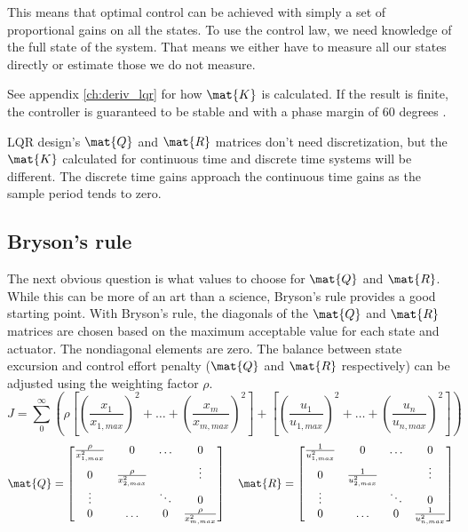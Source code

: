 This means that optimal control can be achieved with simply a set of
proportional gains on all the \glspl{state}. To use the \gls{control law}, we
need knowledge of the full \gls{state} of the \gls{system}. That means we either
have to measure all our \glspl{state} directly or estimate those we do not
measure.

See appendix \ref{ch:deriv_lqr} for how $\mat{K}$ is calculated. If the result
is finite, the controller is guaranteed to be stable and
 with a \gls{phase margin} of 60 degrees
\cite{bib:lqr_phase_margin}.
\begin{remark}
  LQR design's $\mat{Q}$ and $\mat{R}$ matrices don't need \gls{discretization},
  but the $\mat{K}$ calculated for continuous time and discrete time
  \glspl{system} will be different. The discrete time gains approach the
  continuous time gains as the sample period tends to zero.
\end{remark}

\subsection{Bryson's rule}

The next obvious question is what values to choose for $\mat{Q}$ and $\mat{R}$.
While this can be more of an art than a science, Bryson's rule provides a good
starting point. With Bryson's rule, the diagonals of the $\mat{Q}$ and $\mat{R}$
matrices are chosen based on the maximum acceptable value for each \gls{state}
and actuator. The nondiagonal elements are zero. The balance between state
excursion and control effort penalty ($\mat{Q}$ and $\mat{R}$ respectively) can
be adjusted using the weighting factor $\rho$.
\begin{equation*}
  J = \sum_0^\infty \left(\rho \left[
    \left(\frac{x_1}{x_{1,max}}\right)^2 + \ldots +
    \left(\frac{x_m}{x_{m,max}}\right)^2\right] + \left[
    \left(\frac{u_1}{u_{1,max}}\right)^2 + \ldots +
    \left(\frac{u_n}{u_{n,max}}\right)^2\right]\right)
\end{equation*}
\begin{equation*}
  \mat{Q} = \begin{bmatrix}
    \frac{\rho}{x_{1,max}^2} & 0 & \ldots & 0 \\
    0 & \frac{\rho}{x_{2,max}^2} & & \vdots \\
    \vdots & & \ddots & 0 \\
    0 & \ldots & 0 & \frac{\rho}{x_{m,max}^2}
  \end{bmatrix}
  \quad
  \mat{R} = \begin{bmatrix}
    \frac{1}{u_{1,max}^2} & 0 & \ldots & 0 \\
    0 & \frac{1}{u_{2,max}^2} & & \vdots \\
    \vdots & & \ddots & 0 \\
    0 & \ldots & 0 & \frac{1}{u_{n,max}^2}
  \end{bmatrix}
\end{equation*}

